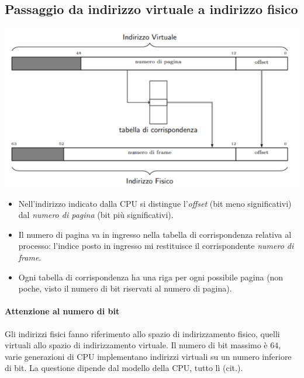 \documentclass[11pt]{report}
\theoremstyle{definition}
\begin{document}
\subsection{Passaggio da indirizzo virtuale a indirizzo fisico} 
\begin{center}
	\includegraphics[scale=.9]{img/214.PNG}
\end{center}
\begin{itemize}
	\item Nell'indirizzo indicato dalla CPU si distingue l'\emph{offset} (bit meno significativi) dal \emph{numero di pagina} (bit più significativi).
	\item Il numero di pagina va in ingresso nella tabella di corrispondenza relativa al processo: l'indice posto in ingresso mi restituisce il corrispondente  \emph{numero di frame}. 
	\item Ogni tabella di corrispondenza ha una riga per ogni possibile pagina (non poche, visto il numero di bit riservati al numero di pagina). 
\end{itemize}
\paragraph{Attenzione al numero di bit} Gli indirizzi fisici fanno riferimento allo spazio di indirizzamento fisico, quelli virtuali allo spazio di indirizzamento virtuale. Il numero di bit massimo è $64$, varie generazioni di CPU implementano indirizzi virtuali su un numero inferiore di bit. La questione dipende dal modello della CPU, tutto lì (cit.). 
\end{document}
